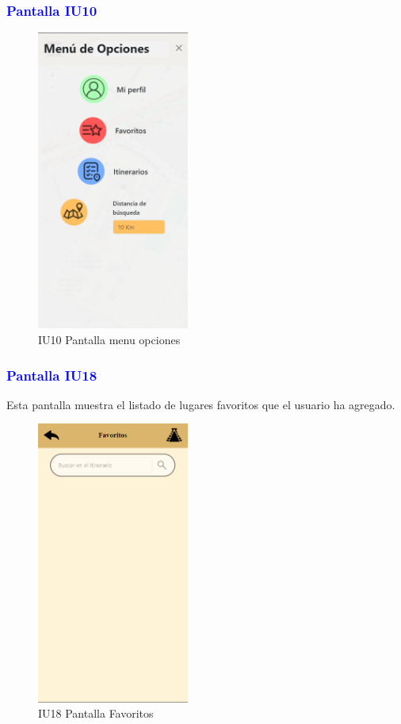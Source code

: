 \subsubsection{\textcolor{blue}{Pantalla IU10}}
\begin{figure}[htb]
        \centering
        \includegraphics[width= 5cm]{entregable final/pantallasSistema/IU10 Pantalla menu opciones.png}
        \caption{IU10 Pantalla menu opciones}
        \label{fig:enter-label}
    \end{figure}
    
\subsubsection{\textcolor{blue}{Pantalla IU18}}
Esta pantalla muestra el listado de lugares favoritos que el usuario ha agregado.

    \begin{figure}[htb]
        \centering
        \includegraphics[width= 5cm]{entregable final/pantallasSistema/IU18 Pantalla Favoritos.png}
        \caption{IU18 Pantalla Favoritos}
        \label{fig:enter-label}
    \end{figure}


